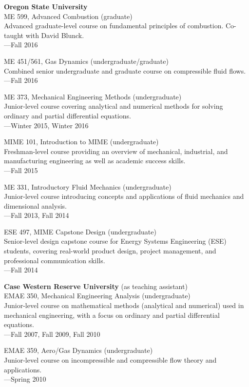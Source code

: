 \documentclass[margin,line,11pt]{res}
\begin{document}
\begin{resume}
\textbf{Oregon State University} \\
ME 599, Advanced Combustion (graduate) \\
Advanced graduate-level course on fundamental principles of combustion. Co-taught with David Blunck.\\
---Fall 2016

ME 451\slash 561, Gas Dynamics (undergraduate\slash graduate) \\
Combined senior undergraduate and graduate course on compressible fluid flows. \\
---Fall 2016

ME 373, Mechanical Engineering Methods (undergraduate) \\
Junior-level course covering analytical and numerical methods for solving ordinary and partial differential equations. \\
---Winter 2015, Winter 2016

MIME 101, Introduction to MIME (undergraduate) \\
Freshman-level course providing an overview of mechanical, industrial, and manufacturing engineering as well as academic success skills. \\
---Fall 2015

ME 331, Introductory Fluid Mechanics (undergraduate) \\
Junior-level course introducing concepts and applications of fluid mechanics and dimensional analysis. \\
---Fall 2013, Fall 2014

ESE 497, MIME Capstone Design (undergraduate) \\
Senior-level design capstone course for Energy Systems Engineering (ESE) students, covering real-world product design, project management, and professional communication skills. \\
---Fall 2014

\textbf{Case Western Reserve University} (as teaching assistant) \\
EMAE 350, Mechanical Engineering Analysis (undergraduate) \\
Junior-level course on mathematical methods (analytical and numerical) used in mechanical engineering, with a focus on ordinary and partial differential equations. \\
---Fall 2007, Fall 2009, Fall 2010

EMAE 359, Aero\slash Gas Dynamics (undergraduate) \\
Junior-level course on incompressible and compressible flow theory and applications. \\
---Spring 2010


\end{resume}
\end{document}
